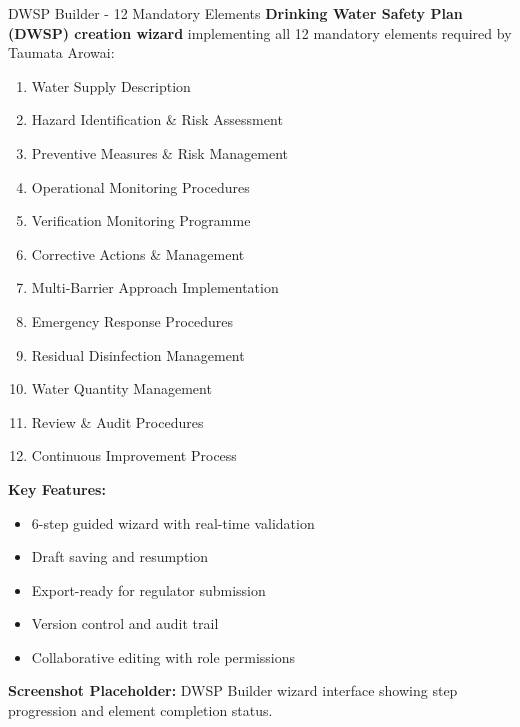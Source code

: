 \documentclass[11pt,a4paper]{article}
\begin{document}
\begin{featurebox}{DWSP Builder - 12 Mandatory Elements}
    \textbf{Drinking Water Safety Plan (DWSP) creation wizard} implementing all 12 mandatory elements required by Taumata Arowai:

    \begin{enumerate}[itemsep=0.2em]
        \item Water Supply Description
        \item Hazard Identification \& Risk Assessment
        \item Preventive Measures \& Risk Management
        \item Operational Monitoring Procedures
        \item Verification Monitoring Programme
        \item Corrective Actions \& Management
        \item Multi-Barrier Approach Implementation
        \item Emergency Response Procedures
        \item Residual Disinfection Management
        \item Water Quantity Management
        \item Review \& Audit Procedures
        \item Continuous Improvement Process
    \end{enumerate}

    \vspace{0.5cm}
    \textbf{Key Features:}
    \begin{itemize}[itemsep=0.2em]
        \item 6-step guided wizard with real-time validation
        \item Draft saving and resumption
        \item Export-ready for regulator submission
        \item Version control and audit trail
        \item Collaborative editing with role permissions
    \end{itemize}
\end{featurebox}

\vspace{0.5cm}

\textbf{Screenshot Placeholder:} DWSP Builder wizard interface showing step progression and element completion status.

\vspace{1cm}
\end{document}
